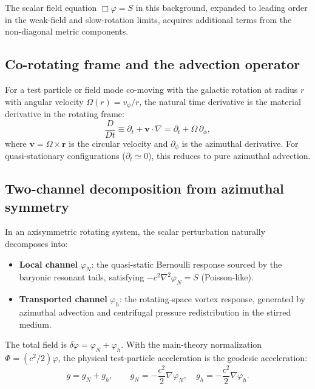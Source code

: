 \documentclass[11pt]{article}
\begin{document}
The scalar field equation $\Box\varphi = S$ in this background, expanded to leading order in the weak-field and slow-rotation limits, acquires additional terms from the non-diagonal metric components.

\subsection{Co-rotating frame and the advection operator}

For a test particle or field mode co-moving with the galactic rotation at radius $r$ with angular velocity $\Omega(r) = v_\phi/r$, the natural time derivative is the material derivative in the rotating frame:
\begin{equation}
\frac{D}{Dt} \equiv \partial_t + \mathbf{v}\cdot\nabla = \partial_t + \Omega\,\partial_\phi,
\label{eq:material_deriv}
\end{equation}
where $\mathbf{v} = \Omega \times \mathbf{r}$ is the circular velocity and $\partial_\phi$ is the azimuthal derivative. For quasi-stationary configurations ($\partial_t \simeq 0$), this reduces to pure azimuthal advection.

\subsection{Two-channel decomposition from azimuthal symmetry}

In an axisymmetric rotating system, the scalar perturbation naturally decomposes into:
\begin{itemize}
\item \textbf{Local channel} $\varphi_N$: the quasi-static Bernoulli response sourced by the baryonic resonant tails, satisfying $-c^2\nabla^2\varphi_N = S$ (Poisson-like).
\item \textbf{Transported channel} $\varphi_h$: the rotating-space vortex response, generated by azimuthal advection and centrifugal pressure redistribution in the stirred medium.
\end{itemize}
The total field is $\delta\varphi = \varphi_N + \varphi_h$.  With the
main-theory normalization $\Phi=(c^2/2)\varphi$, the physical
test-particle acceleration is the geodesic acceleration:
\begin{equation}
g = g_N + g_h, \qquad
g_N = -\frac{c^2}{2}\nabla\varphi_N, \quad
g_h = -\frac{c^2}{2}\nabla\varphi_h.
\label{eq:twochannel_derived}
\end{equation}
\end{document}
